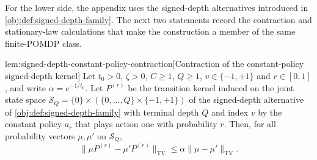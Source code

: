 \documentclass[11pt]{article}
\begin{document}
For the lower side, the appendix uses the signed-depth alternatives introduced in \cref{obj:def:signed-depth-family}. The next two statements record the contraction and stationary-law calculations that make the construction a member of the same finite-POMDP class.

\begin{lemmav}{lem:signed-depth-constant-policy-contraction}[Contraction of the constant-policy signed-depth kernel]
Let \(t_0>0\), \(\zeta>0\), \(C\ge1\), \(Q\ge1\), \(v\in\{-1,+1\}\) and \(r\in[0,1]\), and write \(\alpha=e^{-1/t_0}\). Let \(P^{(r)}\) be the transition kernel induced on the joint state space \(\mathcal S_Q=\{0\}\times(\{0,\ldots,Q\}\times\{-1,+1\})\) of the signed-depth alternative of \cref{obj:def:signed-depth-family} with terminal depth \(Q\) and index \(v\) by the constant policy \(a_r\) that plays action one with probability \(r\). Then, for all probability vectors \(\mu,\mu'\) on \(\mathcal S_Q\),
\[
\|\mu P^{(r)}-\mu'P^{(r)}\|_{\mathrm{TV}}
\le
\alpha\|\mu-\mu'\|_{\mathrm{TV}} .
\]
\end{lemmav}
\end{document}
